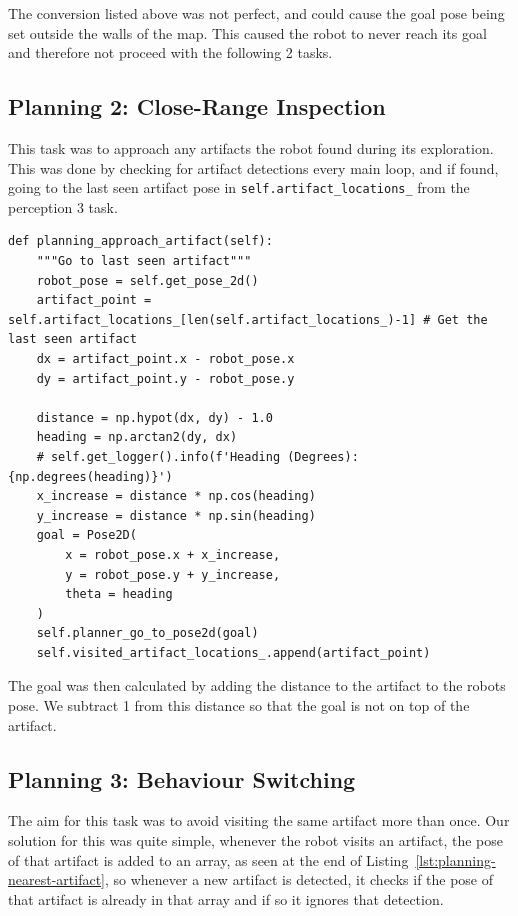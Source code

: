 \documentclass[a4paper,11pt]{article}
\begin{document}
The conversion listed above was not perfect, and could cause the goal pose being set outside the walls of the map.
This caused the robot to never reach its goal and therefore not proceed with the following 2 tasks.

\newpage

\subsection{Planning 2: Close-Range Inspection}
This task was to approach any artifacts the robot found during its exploration.
This was done by checking for artifact detections every main loop, and if found, going to the last seen artifact pose in \texttt{self.artifact\_\allowbreak locations\_} from the perception 3 task.

\begin{lstlisting}[caption={Approach the last seen artifact}, label={lst:planning-nearest-artifact}]
def planning_approach_artifact(self):
    """Go to last seen artifact"""
    robot_pose = self.get_pose_2d()
    artifact_point = self.artifact_locations_[len(self.artifact_locations_)-1] # Get the last seen artifact
    dx = artifact_point.x - robot_pose.x
    dy = artifact_point.y - robot_pose.y

    distance = np.hypot(dx, dy) - 1.0
    heading = np.arctan2(dy, dx)
    # self.get_logger().info(f'Heading (Degrees): {np.degrees(heading)}')
    x_increase = distance * np.cos(heading)
    y_increase = distance * np.sin(heading)
    goal = Pose2D(
        x = robot_pose.x + x_increase,
        y = robot_pose.y + y_increase,
        theta = heading
    )
    self.planner_go_to_pose2d(goal)
    self.visited_artifact_locations_.append(artifact_point)
\end{lstlisting}

The goal was then calculated by adding the distance to the artifact to the robots pose. We subtract 1 from this distance so that the goal is not on top of the artifact.

\newpage

\subsection{Planning 3: Behaviour Switching}
The aim for this task was to avoid visiting the same artifact more than once.
Our solution for this was quite simple, whenever the robot visits an artifact, the pose of that artifact is added to an array, as seen at the end of Listing~\ref{lst:planning-nearest-artifact}, 
so whenever a new artifact is detected, it checks if the pose of that artifact is already in that array and if so it ignores that detection.
\end{document}
